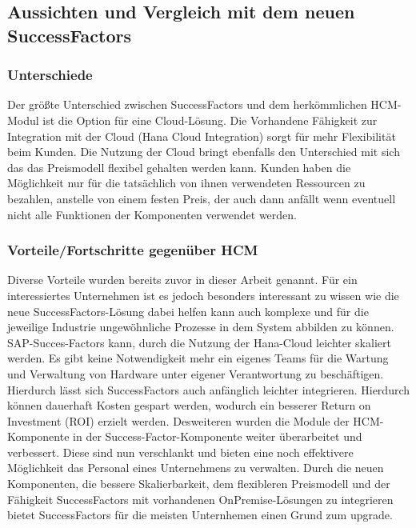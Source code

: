 \subsection{Aussichten und Vergleich mit dem neuen SuccessFactors}
\subsubsection{Unterschiede}
Der größte Unterschied zwischen SuccessFactors und dem herkömmlichen HCM-Modul ist die Option für eine Cloud-Lösung. Die Vorhandene Fähigkeit zur Integration mit der Cloud (Hana Cloud Integration) sorgt für mehr Flexibilität beim Kunden. Die Nutzung der Cloud bringt ebenfalls den Unterschied mit sich das das Preismodell flexibel gehalten werden kann. Kunden haben die Möglichkeit nur für die tatsächlich von ihnen verwendeten Ressourcen zu bezahlen, anstelle von einem festen Preis, der auch dann anfällt wenn eventuell nicht alle Funktionen der Komponenten verwendet werden. 

\subsubsection{Vorteile/Fortschritte gegenüber HCM}
Diverse Vorteile wurden bereits zuvor in dieser Arbeit genannt. Für ein interessiertes Unternehmen ist es jedoch besonders interessant zu wissen wie die neue SuccessFactors-Lösung dabei helfen kann auch komplexe und für die jeweilige Industrie ungewöhnliche Prozesse in dem System abbilden zu können. SAP-Succes-Factors kann, durch die Nutzung der Hana-Cloud leichter skaliert werden. Es gibt keine Notwendigkeit mehr ein eigenes Teams für die Wartung und Verwaltung von Hardware unter eigener Verantwortung zu beschäftigen. Hierdurch lässt sich SuccessFactors auch anfänglich leichter integrieren. Hierdurch können dauerhaft Kosten gespart werden, wodurch ein besserer Return on Investment (ROI) erzielt werden. Desweiteren wurden die Module der HCM-Komponente in der Success-Factor-Komponente weiter überarbeitet und verbessert. Diese sind nun verschlankt und bieten eine noch effektivere Möglichkeit das Personal eines Unternehmens zu verwalten. Durch die neuen Komponenten, die bessere Skalierbarkeit, dem flexibleren Preismodell und der Fähigkeit SuccessFactors mit vorhandenen OnPremise-Lösungen zu integrieren bietet SuccessFactors für die meisten Unternhemen einen Grund zum upgrade. 